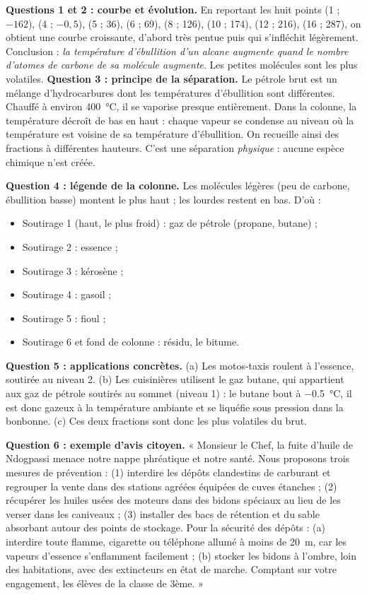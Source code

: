 \documentclass[11pt]{article}
\newcommand{\cle}[1]{{\popxbold\color{popdark}#1}}
\begin{document}
\begin{exoresolu}
\textbf{Questions 1 et 2 : courbe et évolution.} En reportant les huit points (1 ; $-162$), (4 ; $-0,5$), (5 ; 36), (6 ; 69), (8 ; 126), (10 ; 174), (12 ; 216), (16 ; 287), on obtient une courbe croissante, d'abord très pentue puis qui s'infléchit légèrement. Conclusion : \emph{la température d'ébullition d'un alcane augmente quand le nombre d'atomes de carbone de sa molécule augmente}. Les petites molécules sont les plus volatiles.
\tcblower
\textbf{Question 3 : principe de la séparation.} Le pétrole brut est un mélange d'hydrocarbures dont les températures d'ébullition sont différentes. Chauffé à environ \SI{400}{\celsius}, il se vaporise presque entièrement. Dans la colonne, la température décroît de bas en haut : chaque vapeur se condense au niveau où la température est voisine de sa température d'ébullition. On recueille ainsi des \cle{fractions} à différentes hauteurs. C'est une séparation \emph{physique} : aucune espèce chimique n'est créée.

\textbf{Question 4 : légende de la colonne.} Les molécules légères (peu de carbone, ébullition basse) montent le plus haut ; les lourdes restent en bas. D'où :
\begin{itemize}
\item Soutirage 1 (haut, le plus froid) : gaz de pétrole (propane, butane) ;
\item Soutirage 2 : essence ;
\item Soutirage 3 : kérosène ;
\item Soutirage 4 : gasoil ;
\item Soutirage 5 : fioul ;
\item Soutirage 6 et fond de colonne : résidu, le bitume.
\end{itemize}

\textbf{Question 5 : applications concrètes.} (a) Les motos-taxis roulent à l'\cle{essence}, soutirée au niveau 2. (b) Les cuisinières utilisent le \cle{gaz butane}, qui appartient aux gaz de pétrole soutirés au sommet (niveau 1) : le butane bout à \SI{-0,5}{\celsius}, il est donc gazeux à la température ambiante et se liquéfie sous pression dans la bonbonne. (c) Ces deux fractions sont donc les plus volatiles du brut.

\textbf{Question 6 : exemple d'avis citoyen.} « Monsieur le Chef, la fuite d'huile de Ndogpassi menace notre nappe phréatique et notre santé. Nous proposons trois mesures de prévention : (1) interdire les dépôts clandestins de carburant et regrouper la vente dans des stations agréées équipées de cuves étanches ; (2) récupérer les huiles usées des moteurs dans des bidons spéciaux au lieu de les verser dans les caniveaux ; (3) installer des bacs de rétention et du sable absorbant autour des points de stockage. Pour la sécurité des dépôts : (a) interdire toute flamme, cigarette ou téléphone allumé à moins de \SI{20}{m}, car les vapeurs d'essence s'enflamment facilement ; (b) stocker les bidons à l'ombre, loin des habitations, avec des extincteurs en état de marche. Comptant sur votre engagement, les élèves de la classe de 3ème. »
\end{exoresolu}
\end{document}
